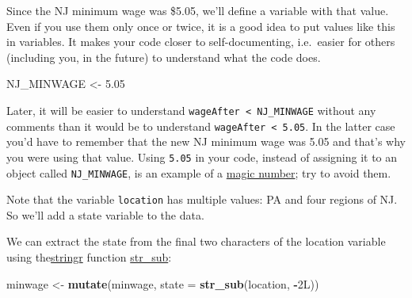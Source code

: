 \documentclass[]{book}
\newenvironment{Shaded}{\begin{snugshade}}{\end{snugshade}}
\newcommand{\CommentTok}[1]{\textcolor[rgb]{0.56,0.35,0.01}{\textit{#1}}}
\newcommand{\DataTypeTok}[1]{\textcolor[rgb]{0.13,0.29,0.53}{#1}}
\newcommand{\FloatTok}[1]{\textcolor[rgb]{0.00,0.00,0.81}{#1}}
\newcommand{\KeywordTok}[1]{\textcolor[rgb]{0.13,0.29,0.53}{\textbf{#1}}}
\newcommand{\NormalTok}[1]{#1}
\newcommand{\OperatorTok}[1]{\textcolor[rgb]{0.81,0.36,0.00}{\textbf{#1}}}
\newcommand{\StringTok}[1]{\textcolor[rgb]{0.31,0.60,0.02}{#1}}
\theoremstyle{definition}
\theoremstyle{definition}
\theoremstyle{definition}
\theoremstyle{remark}
\begin{document}
Since the NJ minimum wage was \$5.05, we'll define a variable with that
value. Even if you use them only once or twice, it is a good idea to put
values like this in variables. It makes your code closer to
self-documenting, i.e.~easier for others (including you, in the future)
to understand what the code does.

\begin{Shaded}
\begin{Highlighting}[]
\NormalTok{NJ_MINWAGE <-}\StringTok{ }\FloatTok{5.05}
\end{Highlighting}
\end{Shaded}

Later, it will be easier to understand
\texttt{wageAfter\ \textless{}\ NJ\_MINWAGE} without any comments than
it would be to understand \texttt{wageAfter\ \textless{}\ 5.05}. In the
latter case you'd have to remember that the new NJ minimum wage was 5.05
and that's why you were using that value. Using \texttt{5.05} in your
code, instead of assigning it to an object called \texttt{NJ\_MINWAGE},
is an example of a
\href{https://en.wikipedia.org/wiki/Magic_number_(programming)\#Unnamed_numerical_constants}{magic
number}; try to avoid them.

Note that the variable \texttt{location} has multiple values: PA and
four regions of NJ. So we'll add a state variable to the data.

\begin{Shaded}
\end{Shaded}

We can extract the state from the final two characters of the location
variable using
the\href{https://cran.r-project.org/package=stringr}{stringr} function
\href{https://www.rdocumentation.org/packages/stringr/topics/str_sub}{str\_sub}:

\begin{Shaded}
\begin{Highlighting}[]
\NormalTok{minwage <-}
\StringTok{  }\KeywordTok{mutate}\NormalTok{(minwage, }\DataTypeTok{state =} \KeywordTok{str_sub}\NormalTok{(location, }\OperatorTok{-}\NormalTok{2L))}
\end{Highlighting}
\end{Shaded}
\end{document}

